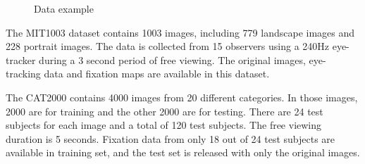 \documentclass[12pt]{article}
\begin{document}
\begin{figure}[!h]
    \centering
    \hspace{1mm}
    \hspace{1mm}
    \caption{Data example}
    \label{img:data_example_2}
\end{figure}

The MIT1003 dataset contains 1003 images, including 779 landscape images and 228 portrait images.
The data is collected from 15 observers using a 240Hz eye-tracker during a 3 second period of 
free viewing. The original images, eye-tracking data and fixation maps are available in this dataset.

The CAT2000 contains 4000 images from 20 different categories. In those images, 2000 are for training and the other 2000
are for testing. There are 24 test subjects for each image and a total of 120 test subjects. The free 
viewing duration is 5 seconds. Fixation data from only 18 out of 24 test subjects are available in training
set, and the test set is released with only the original images.
\end{document}

